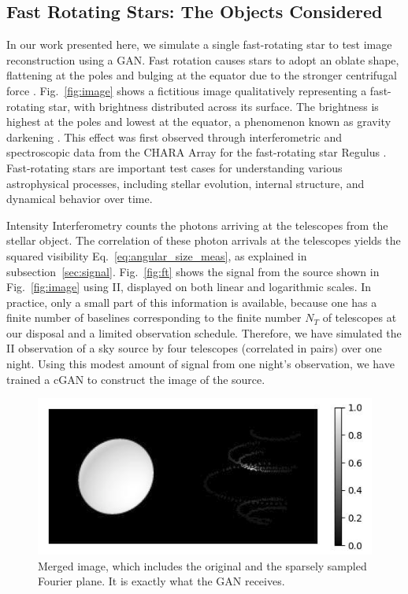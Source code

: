 \subsection{Fast Rotating Stars: The Objects Considered}
In our work presented here, we simulate a single fast-rotating star to test image reconstruction using a GAN. Fast rotation causes stars to adopt an oblate shape, flattening at the poles and bulging at the equator due to the stronger centrifugal force \citep[e.g.,][]{von1924radiative, 1999A&A...347..185M}. Fig.~\ref{fig:image} shows a fictitious image qualitatively representing a fast-rotating star, with brightness distributed across its surface. The brightness is highest at the poles and lowest at the equator, a phenomenon known as gravity darkening \citep{lucy1967gravity}. This effect was first observed through interferometric and spectroscopic data from the CHARA Array for the fast-rotating star Regulus \cite{mcalister2005first}. Fast-rotating stars are important test cases for understanding various astrophysical processes, including stellar evolution, internal structure, and dynamical behavior over time.

Intensity Interferometry counts the photons arriving at the telescopes from the stellar object. The correlation of these photon arrivals at the telescopes yields the squared visibility Eq.~\eqref{eq:angular_size_meas}, as explained in subsection~\ref{sec:signal}. Fig.~\ref{fig:ft} shows the signal from the source shown in Fig.~\ref{fig:image} using II, displayed on both linear and logarithmic scales. In practice, only a small part of this information is available, because one has a finite number of baselines corresponding to the finite number $N_T$ of telescopes at our disposal and a limited observation schedule. Therefore, we have simulated the II observation of a sky source by four telescopes (correlated in pairs) over one night. Using this modest amount of signal from one night's observation, we have trained a cGAN to construct the image of the source.
\begin{figure}
  \includegraphics[width=\linewidth]{fig/ellipse1612.png}
  \caption{Merged image, which includes the original and the sparsely sampled Fourier plane. It is exactly what the GAN receives.}
  \label{fig:GANinput}
\end{figure}
